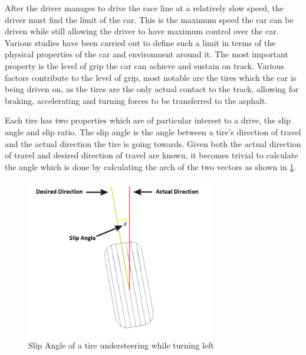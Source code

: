 After the driver manages to drive the race line at a relatively slow speed, the driver must find the limit of the car. This is the maximum speed the car can be driven while still allowing the driver to have maximum control over the car. Various studies have been carried out to define such a limit in terms of the physical properties of the car and environment around it. The most important property is the level of grip the car can achieve and sustain on track. Various factors contribute to the level of grip, most notable are the tires which the car is being driven on, as the tires are the only actual contact to the track, allowing for braking, accelerating and turning forces to be transferred to the asphalt.

Each tire has two properties which are of particular interest to a drive, the slip angle and slip ratio. The slip angle is the angle between a tire’s direction of travel and the actual direction the tire is going towards. Given both the actual direction of travel and desired direction of travel are known, it becomes trivial to calculate the angle which is done by calculating the arch of the two vectors as shown in \ref{fig:slipangle}.

\begin{figure}[!htb]
	\centering
	\includegraphics[height=7cm]{images/slipangle}
	\caption{Slip Angle of a tire understeering while turning left}
	\label{fig:slipangle}
\end{figure}

